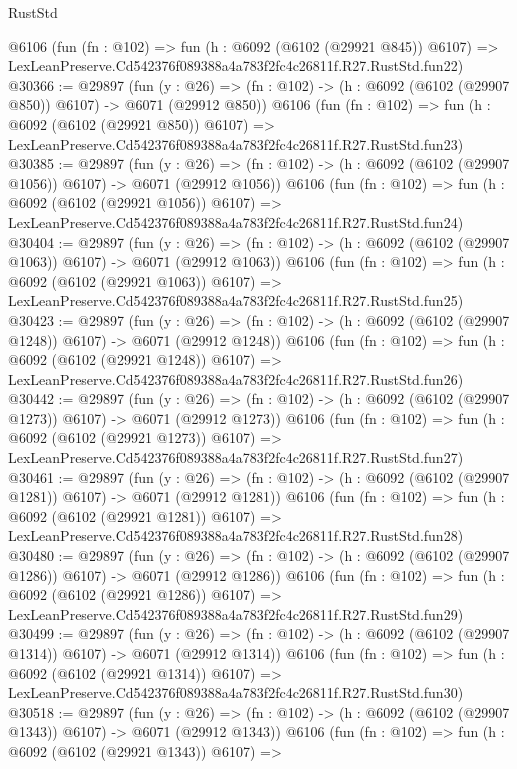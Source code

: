 \begin{lexlean}{RustStd}
\begin{coremodule}
    @6106
    (fun (fn : @102) =>
    fun (h : @6092 (@6102 (@29921 @845)) @6107) =>
    LexLeanPreserve.Cd542376f089388a4a783f2fc4c26811f.R27.RustStd.fun22)
@30366 := @29897
    (fun (y : @26) => (fn : @102) -> (h : @6092 (@6102 (@29907 @850)) @6107) -> @6071 (@29912 @850))
    @6106
    (fun (fn : @102) =>
    fun (h : @6092 (@6102 (@29921 @850)) @6107) =>
    LexLeanPreserve.Cd542376f089388a4a783f2fc4c26811f.R27.RustStd.fun23)
@30385 := @29897
    (fun (y : @26) =>
    (fn : @102) -> (h : @6092 (@6102 (@29907 @1056)) @6107) -> @6071 (@29912 @1056))
    @6106
    (fun (fn : @102) =>
    fun (h : @6092 (@6102 (@29921 @1056)) @6107) =>
    LexLeanPreserve.Cd542376f089388a4a783f2fc4c26811f.R27.RustStd.fun24)
@30404 := @29897
    (fun (y : @26) =>
    (fn : @102) -> (h : @6092 (@6102 (@29907 @1063)) @6107) -> @6071 (@29912 @1063))
    @6106
    (fun (fn : @102) =>
    fun (h : @6092 (@6102 (@29921 @1063)) @6107) =>
    LexLeanPreserve.Cd542376f089388a4a783f2fc4c26811f.R27.RustStd.fun25)
@30423 := @29897
    (fun (y : @26) =>
    (fn : @102) -> (h : @6092 (@6102 (@29907 @1248)) @6107) -> @6071 (@29912 @1248))
    @6106
    (fun (fn : @102) =>
    fun (h : @6092 (@6102 (@29921 @1248)) @6107) =>
    LexLeanPreserve.Cd542376f089388a4a783f2fc4c26811f.R27.RustStd.fun26)
@30442 := @29897
    (fun (y : @26) =>
    (fn : @102) -> (h : @6092 (@6102 (@29907 @1273)) @6107) -> @6071 (@29912 @1273))
    @6106
    (fun (fn : @102) =>
    fun (h : @6092 (@6102 (@29921 @1273)) @6107) =>
    LexLeanPreserve.Cd542376f089388a4a783f2fc4c26811f.R27.RustStd.fun27)
@30461 := @29897
    (fun (y : @26) =>
    (fn : @102) -> (h : @6092 (@6102 (@29907 @1281)) @6107) -> @6071 (@29912 @1281))
    @6106
    (fun (fn : @102) =>
    fun (h : @6092 (@6102 (@29921 @1281)) @6107) =>
    LexLeanPreserve.Cd542376f089388a4a783f2fc4c26811f.R27.RustStd.fun28)
@30480 := @29897
    (fun (y : @26) =>
    (fn : @102) -> (h : @6092 (@6102 (@29907 @1286)) @6107) -> @6071 (@29912 @1286))
    @6106
    (fun (fn : @102) =>
    fun (h : @6092 (@6102 (@29921 @1286)) @6107) =>
    LexLeanPreserve.Cd542376f089388a4a783f2fc4c26811f.R27.RustStd.fun29)
@30499 := @29897
    (fun (y : @26) =>
    (fn : @102) -> (h : @6092 (@6102 (@29907 @1314)) @6107) -> @6071 (@29912 @1314))
    @6106
    (fun (fn : @102) =>
    fun (h : @6092 (@6102 (@29921 @1314)) @6107) =>
    LexLeanPreserve.Cd542376f089388a4a783f2fc4c26811f.R27.RustStd.fun30)
@30518 := @29897
    (fun (y : @26) =>
    (fn : @102) -> (h : @6092 (@6102 (@29907 @1343)) @6107) -> @6071 (@29912 @1343))
    @6106
    (fun (fn : @102) =>
    fun (h : @6092 (@6102 (@29921 @1343)) @6107) =>

\end{coremodule}
\end{lexlean}
